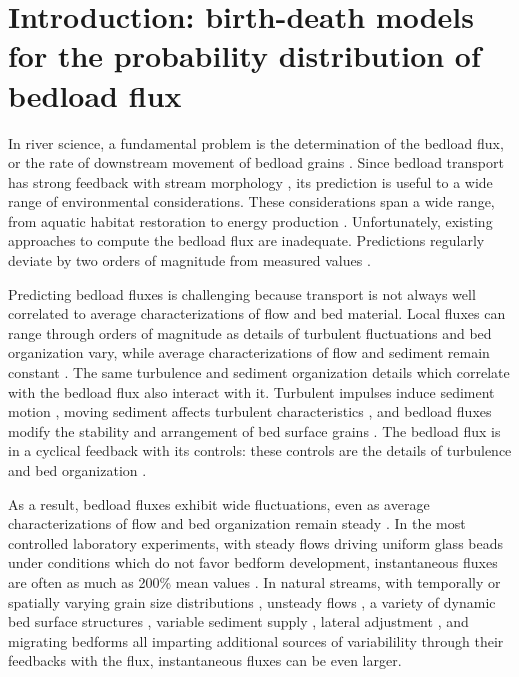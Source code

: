 \section{Introduction: birth-death models for the probability distribution of bedload flux}

In river science, a fundamental problem is the determination of the bedload flux, or the rate of downstream movement of bedload grains \citep{Ballio2014}.
Since bedload transport has strong feedback with stream morphology \citep{Church2006, Recking2016}, its prediction is useful to a wide range of environmental considerations. 
These considerations span a wide range, from aquatic habitat restoration to energy production \citep{Kondolf2014, Wohl2015a}. 
Unfortunately, existing approaches to compute the bedload flux are inadequate. 
Predictions regularly deviate by two orders of magnitude from measured values \citep{Gomez1989, Barry2004, Bathurst2007a, Recking2012}. 

Predicting bedload fluxes is challenging because transport is not always well correlated to average characterizations of flow and bed material. 
Local fluxes can range through orders of magnitude as details of turbulent fluctuations and bed organization vary, while average characterizations of flow and sediment remain constant \citep{Sumer2003, Charru2004, Hassan2008, Venditti2017}.
The same turbulence and sediment organization details which correlate with the bedload flux also interact with it. 
Turbulent impulses induce sediment motion \citep{Valyrakis2010, Celik2014, Amir2014, Shih2017}, moving sediment affects turbulent characteristics \citep{Singh2010, Santos2014, Liu2016}, and bedload fluxes modify the stability and arrangement of bed surface grains \citep{Kirchener1990, Charru2004, Hassan2008}.
The bedload flux is in a cyclical feedback with its controls: these controls are the details of turbulence and bed organization \citep{Jerolmack2005}. 

As a result, bedload fluxes exhibit wide fluctuations, even as average characterizations of flow and bed organization remain steady \citep{Ancey2014}.
In the most controlled laboratory experiments, with steady flows driving uniform glass beads under conditions which do not favor bedform development, instantaneous fluxes are often as much as 200\% mean values \citep{Bohm2004, Ancey2008, Heyman2014, Heyman2016}. 
In natural streams, with temporally or spatially varying grain size distributions \citep{Lisle1992, Chen2008}, unsteady flows \citep{Mao2012, FerrerBoix2015}, a variety of dynamic bed surface structures \citep{Hassan2008, Venditti2017}, variable sediment supply \citep{Madej2009, Elgueta2018}, lateral adjustment \citep{Pitlick2013, Redolfi2018}, and migrating bedforms \citep{Gomez1989, Dhont2018} all imparting additional sources of variabilility through their feedbacks with the flux, instantaneous fluxes can be even larger. 

